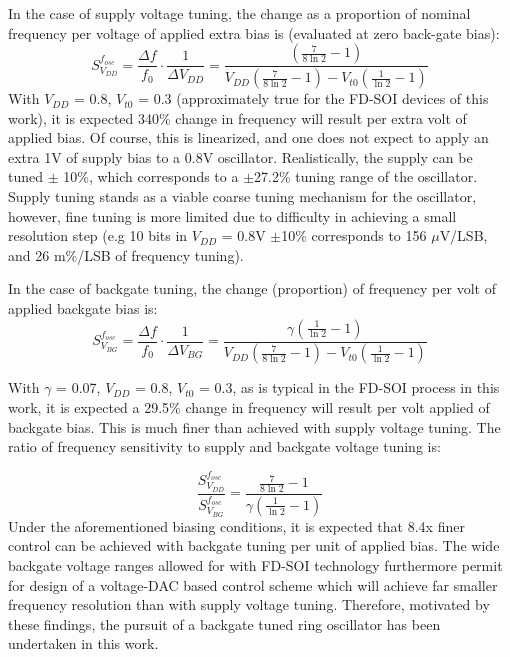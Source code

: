 		In the case of supply voltage tuning, the change as a proportion of nominal frequency per voltage of applied extra bias is (evaluated at zero back-gate bias):
		\begin{equation}
			S^{f_{osc}}_{V_{DD}} = \frac{\Delta f}{f_0}\cdot\frac{1}{\Delta V_{DD}}  = \frac{\left(\frac{7}{8\ln2}-1\right)}{V_{DD}\left(\frac{7}{8\ln2}-1\right)-V_{t0}\left(\frac{1}{\ln2}-1\right)}
		\end{equation}
		With $V_{DD}$ = 0.8, $V_{t0}$ = 0.3 (approximately true for the FD-SOI devices of this work), it is expected 340\% change in frequency will result per extra volt of applied bias. Of course, this is linearized, and one does not expect to apply an extra 1V of supply bias to a 0.8V oscillator. Realistically, the supply can be tuned $\pm$ 10\%, which corresponds to a $\pm$27.2\% tuning range of the oscillator. Supply tuning stands as a viable coarse tuning mechanism for the oscillator, however, fine tuning is more limited due to difficulty in achieving a small resolution step (e.g 10 bits in $V_{DD}$ = 0.8V $\pm$10\% corresponds to 156 $\mu$V/LSB, and 26 m\%/LSB of frequency tuning).

		\par In the case of backgate tuning, the change (proportion) of frequency per volt of applied backgate bias is:
		\begin{equation}
			S^{f_{osc}}_{V_{BG}} = \frac{\Delta f}{f_0}\cdot\frac{1}{\Delta V_{BG}}  = \frac{\gamma \left(\frac{1}{\ln2}-1\right)}{V_{DD}\left(\frac{7}{8\ln2}-1\right)-V_{t0}\left(\frac{1}{\ln2}-1\right)}
		\end{equation}

		With $\gamma$ = 0.07, $V_{DD}$ = 0.8, $V_{t0}$ = 0.3, as is typical in the FD-SOI process in this work, it is expected a 29.5\% change in frequency will result per volt applied of backgate bias. This is much finer than achieved with supply voltage tuning. The ratio of frequency sensitivity to supply and backgate voltage tuning is:

		\begin{equation}
			\frac{S^{f_{osc}}_{V_{DD}}}{S^{f_{osc}}_{V_{BG}}} =  \frac{\frac{7}{8\ln2}-1}{\gamma \left(\frac{1}{\ln2}-1\right)}
		\end{equation}
		Under the aforementioned biasing conditions, it is expected that 8.4x finer control can be achieved with backgate tuning per unit of applied bias. The wide backgate voltage ranges allowed for with FD-SOI technology furthermore permit for design of a voltage-DAC based control scheme which will achieve far smaller frequency resolution than with supply voltage tuning. Therefore, motivated by these findings, the pursuit of a backgate tuned ring oscillator has been undertaken in this work.

